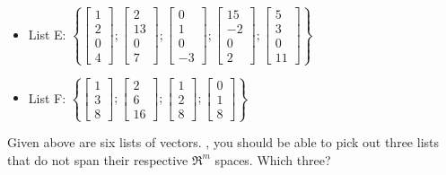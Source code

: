 \begin{itemize}
\item
List E: $\left\{ \left[ \begin{array}{c} 1 \\ 2 \\ 0 \\ 4\end{array} \right] ; 
\left[ \begin{array}{c} 2 \\ 13 \\ 0 \\ 7\end{array} \right] ; 
\left[ \begin{array}{c} 0 \\ 1 \\ 0 \\ -3\end{array} \right] ; 
\left[ \begin{array}{c} 15 \\ -2 \\ 0 \\ 2\end{array} \right] ; 
\left[ \begin{array}{c} 5 \\ 3 \\ 0 \\ 11\end{array} \right]  \right\}$



\item
List F: $\left\{ \left[ \begin{array}{c} 1 \\ 3 \\ 8 \end{array} \right] ; 
\left[ \begin{array}{c} 2 \\ 6 \\ 16 \end{array} \right] ;
\left[ \begin{array}{c} 1 \\ 2 \\ 8 \end{array} \right] ; 
\left[ \begin{array}{c} 0 \\ 1 \\ 8 \end{array} \right] \right\} $
\end{itemize}

Given above are six lists of vectors.  {}, you should be able to pick out three lists
that do not span their respective $\Re^m$ spaces.  Which three?  



\edXsolution{  }

\endedxproblem



\endedxvertical
